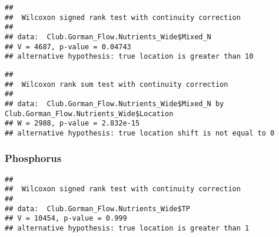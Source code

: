 \documentclass[]{article}
\newenvironment{Shaded}{\begin{snugshade}}{\end{snugshade}}
\newcommand{\DataTypeTok}[1]{\textcolor[rgb]{0.13,0.29,0.53}{#1}}
\newcommand{\DecValTok}[1]{\textcolor[rgb]{0.00,0.00,0.81}{#1}}
\newcommand{\KeywordTok}[1]{\textcolor[rgb]{0.13,0.29,0.53}{\textbf{#1}}}
\newcommand{\NormalTok}[1]{#1}
\newcommand{\OperatorTok}[1]{\textcolor[rgb]{0.81,0.36,0.00}{\textbf{#1}}}
\newcommand{\StringTok}[1]{\textcolor[rgb]{0.31,0.60,0.02}{#1}}
\begin{document}
\begin{verbatim}
## 
##  Wilcoxon signed rank test with continuity correction
## 
## data:  Club.Gorman_Flow.Nutrients_Wide$Mixed_N
## V = 4687, p-value = 0.04743
## alternative hypothesis: true location is greater than 10
\end{verbatim}

\begin{Shaded}
\end{Shaded}

\begin{verbatim}
## 
##  Wilcoxon rank sum test with continuity correction
## 
## data:  Club.Gorman_Flow.Nutrients_Wide$Mixed_N by Club.Gorman_Flow.Nutrients_Wide$Location
## W = 2988, p-value = 2.832e-15
## alternative hypothesis: true location shift is not equal to 0
\end{verbatim}

\hypertarget{phosphorus-2}{%
\subsubsection{Phosphorus}\label{phosphorus-2}}

\begin{Shaded}
\end{Shaded}

\begin{verbatim}
## 
##  Wilcoxon signed rank test with continuity correction
## 
## data:  Club.Gorman_Flow.Nutrients_Wide$TP
## V = 10454, p-value = 0.999
## alternative hypothesis: true location is greater than 1
\end{verbatim}

\begin{Shaded}
\end{Shaded}
\end{document}
